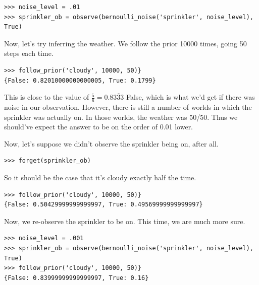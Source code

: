 \documentclass[11pt]{article}
\begin{document}
\begin{small}
\begin{verbatim}
>>> noise_level = .01
>>> sprinkler_ob = observe(bernoulli_noise('sprinkler', noise_level), True)
\end{verbatim}
\end{small}

\noindent Now, let's try inferring the weather.  We follow the prior 10000 times, going 50 steps each time.  

\begin{small}
\begin{verbatim}
>>> follow_prior('cloudy', 10000, 50)}
{False: 0.82010000000000005, True: 0.1799}
\end{verbatim}
\end{small}

This is close to the value of $\frac{5}{6} = 0.8\overline{333}$ False, which is what we'd get if there was noise in our observation.  However, there is still a number of worlds in which the sprinkler was actually on.  In those worlds, the weather was 50/50.  Thus we should've expect the answer to be on the order of 0.01 lower.  \vspace{6 pt}

Now, let's suppose we didn't observe the sprinkler being on, after all.


\begin{small}
\begin{verbatim} 
>>> forget(sprinkler_ob)
\end{verbatim}
\end{small}

\noindent So it should be the case that it's cloudy exactly half the time.

\begin{small}
\begin{verbatim}
>>> follow_prior('cloudy', 10000, 50)}
{False: 0.50429999999999997, True: 0.49569999999999997}
\end{verbatim}
\end{small}

\noindent  Now, we re-observe the sprinkler to be on.  This time, we are much more sure.

\begin{small}
\begin{verbatim}
>>> noise_level = .001
>>> sprinkler_ob = observe(bernoulli_noise('sprinkler', noise_level), True)
>>> follow_prior('cloudy', 10000, 50)}
{False: 0.83999999999999997, True: 0.16}
\end{verbatim}
\end{small}
\end{document}

